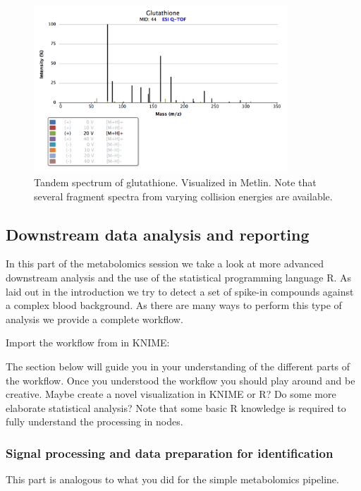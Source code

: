 \begin{figure}[htbp]
  \centering
  \includegraphics[width=0.85\textwidth]{graphics/metabo/glutathioneMetlin.png}
  \caption{Tandem spectrum of glutathione. Visualized in Metlin. Note that several fragment spectra from varying collision energies are available.}
  \label{fig:glutathioneMetlin}
\end{figure}

\subsection{Downstream data analysis and reporting}
In this part of the metabolomics session we take a look at more advanced downstream analysis and the use of the statistical programming language R. As laid out in the introduction we try to detect a set of spike-in compounds against a complex blood background. As there are many ways to perform this type of analysis we provide a complete workflow.

\begin{task}
Import the workflow from  in KNIME: 
\end{task}

The section below will guide you in your understanding of the different parts of the workflow. Once you understood the workflow you should play around and be creative. Maybe create a novel visualization in KNIME or R? Do some more elaborate statistical analysis? Note that some basic R knowledge is required to fully understand the processing in  nodes.

\subsubsection{Signal processing and data preparation for identification}
This part is analogous to what you did for the simple metabolomics pipeline.

